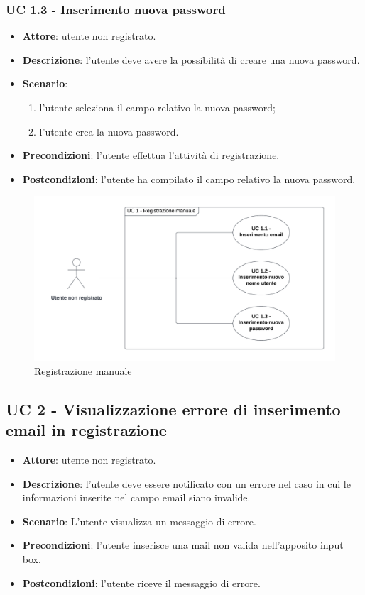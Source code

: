 \subsubsection{UC 1.3 - Inserimento nuova password}
\begin{itemize}
    \item \textbf{Attore}: utente non registrato.
    \item \textbf{Descrizione}: l’utente deve avere la possibilità di creare una nuova password.
    \item \textbf{Scenario}:
    \begin{enumerate}
        \item l’utente seleziona il campo relativo la nuova password;
        \item l’utente crea la nuova password.
    \end{enumerate}

    \item \textbf{Precondizioni}: l’utente effettua l’attività di registrazione.
    \item \textbf{Postcondizioni}: l’utente ha compilato il campo relativo la nuova password.
\end{itemize}


\begin{figure}[!h]
    \includegraphics[width=15cm]{sezioni/Images/UC1_s.png}
    \centering
    \caption{Registrazione manuale}
\end{figure}

\subsection{UC 2 - Visualizzazione errore di inserimento email in registrazione}
\begin{itemize}
    \item \textbf{Attore}: utente non registrato.
    \item \textbf{Descrizione}: l’utente deve essere notificato con un errore nel caso in cui le informazioni inserite nel campo email siano invalide.
    \item \textbf{Scenario}: L’utente visualizza un messaggio di errore.
    \item \textbf{Precondizioni}: l’utente inserisce una mail non valida nell'apposito input box.
    \item \textbf{Postcondizioni}: l’utente riceve il messaggio di errore.
\end{itemize}

